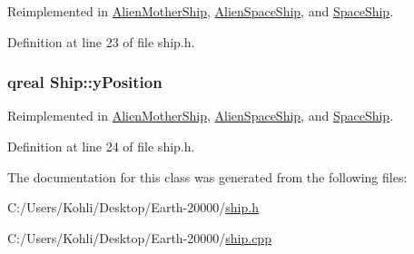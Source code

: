 Reimplemented in \hyperlink{class_alien_mother_ship_a7c7c0ac12f0eb3add61f5d7a47fe93ee}{AlienMotherShip}, \hyperlink{class_alien_space_ship_a4539a2e1dba8598cbc42fa262f586acd}{AlienSpaceShip}, and \hyperlink{class_space_ship_a4f960ec3383ec268c7db8c97b97a5c7d}{SpaceShip}.

Definition at line 23 of file ship.h.\hypertarget{class_ship_a5964ed05737d3b6722c7af5e0f173475}{
\subsubsection[{yPosition}]{\setlength{\rightskip}{0pt plus 5cm}qreal {\bf Ship::yPosition}}}
\label{class_ship_a5964ed05737d3b6722c7af5e0f173475}


Reimplemented in \hyperlink{class_alien_mother_ship_af3b24eae146d655107298345d577d96d}{AlienMotherShip}, \hyperlink{class_alien_space_ship_acb7a7bbfb71e3673768212f9239ea3b3}{AlienSpaceShip}, and \hyperlink{class_space_ship_a01360fa6f81ff5c448d68142293f578b}{SpaceShip}.

Definition at line 24 of file ship.h.

The documentation for this class was generated from the following files:\begin{DoxyCompactItemize}
\item 
C:/Users/Kohli/Desktop/Earth-\/20000/\hyperlink{ship_8h}{ship.h}\item 
C:/Users/Kohli/Desktop/Earth-\/20000/\hyperlink{ship_8cpp}{ship.cpp}\end{DoxyCompactItemize}
